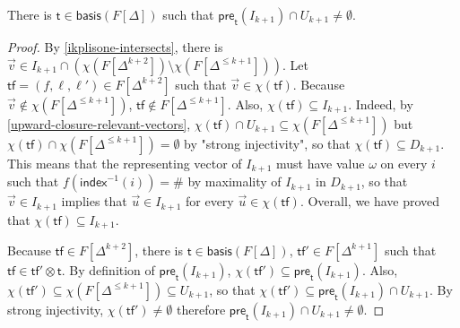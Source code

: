 \documentclass[10pt,a4paper]{article}
\renewcommand{\leq}{\leqslant}
\newcommand{\preop}{\mathsf{pre}}
\newcommand{\transitions}{\Delta}
\newcommand*{\abuchistate}{\ell}
\newcommand*{\controlloc}{\abuchistate}
\newcommand*{\dummysymb}{\#}
\newcommand*{\minwqo}[1]{\mathsf{basis}(#1)}
\newcommand*{\transfersof}[1]{F[#1]}
\newcommand*{\atf}{\mathsf{tf}}
\newcommand*{\tftimes}{\otimes}
\newcommand*{\preflows}[2]{\preop_{#1}(#2)}
\newcommand{\Tleq}[1]{\transfersof{\transitions^{\leq #1}}}
\newcommand{\Tpow}[1]{\transfersof{\transitions^{#1}}}
\newcommand{\T}{\transfersof{\transitions}}
\newcommand*{\mapencoding}{\chi}
\newcommand*{\indexof}{\mathsf{index}}
\newcommand*{\tftrans}{\mathsf{t}}
\newcommand*{\Tmin}{\minwqo{\T}}
\begin{document}
\begin{appendixproof}
	\begin{lemma}
		\label{pret-intersects}
		There is \(\tftrans \in \Tmin\) such that \(\preflows{\tftrans}{I_{k+1}} \cap U_{k+1} \ne \emptyset\).
	\end{lemma}
	\begin{proof}
		By \cref{ikplisone-intersects}, there is \(\vec{v} \in I_{k+1} \cap (\mapencoding(\Tpow{k+2}) \setminus \mapencoding(\Tleq{k+1}))\).
		Let \(\atf = (f, \controlloc, \controlloc') \in \Tpow{k+2}\) such that \(\vec{v} \in \mapencoding(\atf)\).
		Because \(\vec{v}\notin \mapencoding(\Tleq{k+1})\), \(\atf \notin \Tleq{k+1}\).
		Also, \(\mapencoding(\atf) \subseteq I_{k+1}\).
		Indeed, by \cref{upward-closure-relevant-vectors}, \(\mapencoding(\atf) \cap U_{k+1} \subseteq \mapencoding(\Tleq{k+1})\) but \(\mapencoding(\atf) \cap \mapencoding(\Tleq{k+1}) = \emptyset\) by "strong injectivity", so that \(\mapencoding(\atf) \subseteq D_{k+1}\).
		This means that the representing vector of \(I_{k+1}\) must have value \(\omega\) on every \(i\) such that \(f(\indexof^{-1}(i)) = \dummysymb\) by maximality of \(I_{k+1}\) in \(D_{k+1}\), so that \(\vec{v} \in I_{k+1}\) implies that \(\vec{u} \in I_{k+1}\) for every \(\vec{u} \in \mapencoding(\atf)\).
		Overall, we have proved that \(\mapencoding(\atf) \subseteq I_{k+1}\).

		Because \(\atf \in \Tpow{k+2}\), there is \(\tftrans \in \Tmin\), \(\atf' \in \Tpow{k+1}\) such that \(\atf \in \atf' \tftimes \tftrans\).
		By definition of \(\preflows{\tftrans}{I_{k+1}}\), \(\mapencoding(\atf') \subseteq \preflows{\tftrans}{I_{k+1}}\).
		Also, \(\mapencoding(\atf') \subseteq \mapencoding(\Tleq{k+1}) \subseteq U_{k+1}\), so that \(\mapencoding(\atf') \subseteq \preflows{\tftrans}{I_{k+1}} \cap U_{k+1}\).
		By strong injectivity, \(\mapencoding(\atf') \ne \emptyset\) therefore \(\preflows{\tftrans}{I_{k+1}} \cap U_{k+1}\ne \emptyset\).
	\end{proof}


\end{appendixproof}
\end{document}

